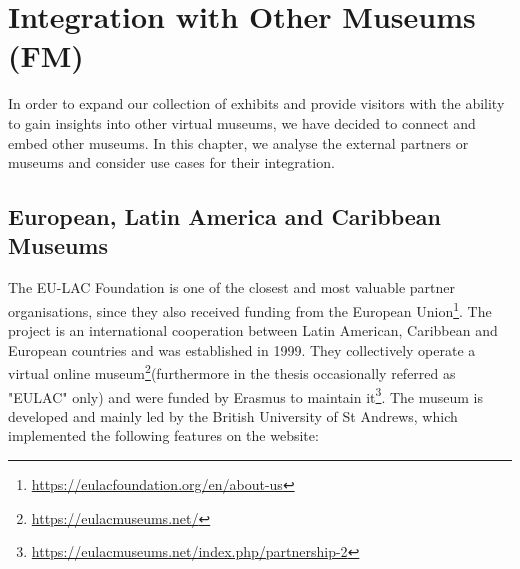 \chapter{Integration with Other Museums (FM)}
\label{cha:Integration with Other Museums}

In order to expand our collection of exhibits and provide visitors with the ability to gain insights into other virtual museums, we have decided to connect and embed other museums. In this chapter, we analyse the external partners or museums and consider use cases for their integration.

\section{European, Latin America and Caribbean Museums} \label{EULAC}


The EU-LAC Foundation is one of the closest and most valuable partner organisations, since they also received funding from the European Union\footnote{\url{https://eulacfoundation.org/en/about-us}}. The project is an international cooperation between Latin American, Caribbean and European countries and was established in 1999. They collectively operate a virtual online museum\footnote{\url{https://eulacmuseums.net/}}(furthermore in the thesis occasionally referred as "EULAC" only) and were funded by Erasmus to maintain it\footnote{\url{https://eulacmuseums.net/index.php/partnership-2}}. The museum is developed and mainly led by the British University of St Andrews, which implemented the following features on the website:

